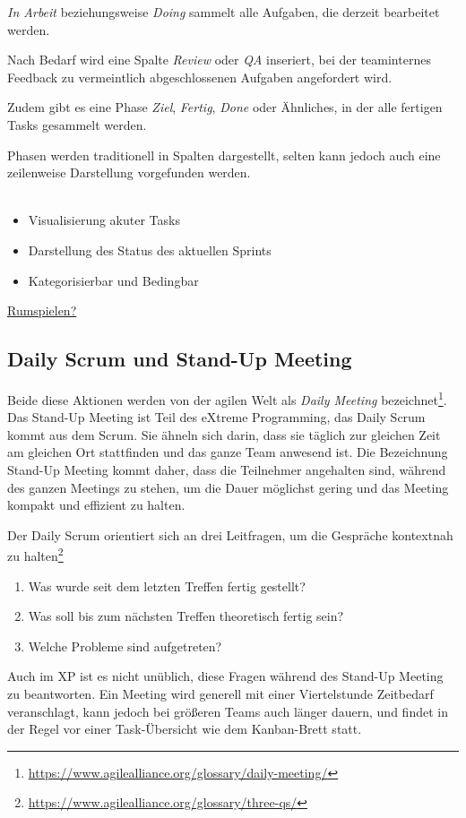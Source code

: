 		\textit{In Arbeit} beziehungsweise \textit{Doing} sammelt alle Aufgaben, die derzeit bearbeitet werden.
		
		Nach Bedarf wird eine Spalte \textit{Review} oder \textit{QA} inseriert, bei der teaminternes Feedback zu vermeintlich abgeschlossenen Aufgaben angefordert wird.
		
		Zudem gibt es eine Phase \textit{Ziel}, \textit{Fertig}, \textit{Done} oder Ähnliches, in der alle fertigen Tasks gesammelt werden.
		
		Phasen werden traditionell in Spalten dargestellt, selten kann jedoch auch eine zeilenweise Darstellung vorgefunden werden.
		\-\\\\
		\begin{itemize}
			\item Visualisierung akuter Tasks
			\item Darstellung des Status des aktuellen Sprints
			\item Kategorisierbar und Bedingbar
		\end{itemize}
		\href{http://www.kanbansim.org/boards/b254f2363d0197a551180984b48b60a1}{Rumspielen?}
			
	\subsection{Daily Scrum und Stand-Up Meeting}
		\label{ssec:daily}
		Beide diese Aktionen werden von der agilen Welt als \textit{Daily Meeting} bezeichnet\footnote{
			\url{https://www.agilealliance.org/glossary/daily-meeting/}
		}.
		Das Stand-Up Meeting ist Teil des eXtreme Programming, das Daily Scrum kommt aus dem Scrum.
		Sie ähneln sich darin, dass sie täglich zur gleichen Zeit am gleichen Ort stattfinden und das ganze Team anwesend ist.
		Die Bezeichnung Stand-Up Meeting kommt daher, dass die Teilnehmer angehalten sind, während des ganzen Meetings zu stehen, um die Dauer möglichst gering und das Meeting kompakt und effizient zu halten.
		
		Der Daily Scrum orientiert sich an drei Leitfragen, um die Gespräche kontextnah zu halten\footnote{
			\url{https://www.agilealliance.org/glossary/three-qs/}
		}
		\begin{enumerate}
			\item Was wurde seit dem letzten Treffen fertig gestellt?
			\item Was soll bis zum nächsten Treffen theoretisch fertig sein?
			\item Welche Probleme sind aufgetreten?
		\end{enumerate}
		Auch im XP ist es nicht unüblich, diese Fragen während des Stand-Up Meeting zu beantworten.
		Ein Meeting wird generell mit einer Viertelstunde Zeitbedarf veranschlagt, kann jedoch bei größeren Teams auch länger dauern, und findet in der Regel vor einer Task-Übersicht wie dem Kanban-Brett statt.
		
